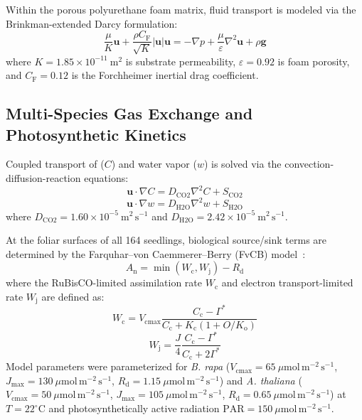 \documentclass[pdflatex,sn-nature,iicol]{sn-jnl}
\begin{document}
Within the porous polyurethane foam matrix, fluid transport is modeled via the Brinkman-extended Darcy formulation:
\begin{equation}
\frac{\mu}{K} \mathbf{u} + \frac{\rho C_{\mathrm{F}}}{\sqrt{K}} |\mathbf{u}| \mathbf{u} = -\nabla p + \frac{\mu}{\varepsilon} \nabla^2 \mathbf{u} + \rho \mathbf{g}
\label{eq:brinkman}
\end{equation}
where $K = 1.85 \times 10^{-11}\ \mathrm{m^2}$ is substrate permeability, $\varepsilon = 0.92$ is foam porosity, and $C_{\mathrm{F}} = 0.12$ is the Forchheimer inertial drag coefficient.

\subsection{Multi-Species Gas Exchange and Photosynthetic Kinetics}\label{sec:fvcb_meth}

Coupled transport of  ($C$) and water vapor ($w$) is solved via the convection-diffusion-reaction equations:
\begin{equation}
\mathbf{u} \cdot \nabla C = D_{\mathrm{CO2}} \nabla^2 C + S_{\mathrm{CO2}}
\label{eq:scalar_co2}
\end{equation}
\begin{equation}
\mathbf{u} \cdot \nabla w = D_{\mathrm{H2O}} \nabla^2 w + S_{\mathrm{H2O}}
\label{eq:scalar_h2o}
\end{equation}
where $D_{\mathrm{CO2}} = 1.60 \times 10^{-5}\ \mathrm{m^2\,s^{-1}}$ and $D_{\mathrm{H2O}} = 2.42 \times 10^{-5}\ \mathrm{m^2\,s^{-1}}$.

At the foliar surfaces of all 164 seedlings, biological source/sink terms are determined by the Farquhar--von Caemmerer--Berry (FvCB) model~\cite{farquhar1980biochemical}:
\begin{equation}
A_{\mathrm{n}} = \min(W_{\mathrm{c}}, W_{\mathrm{j}}) - R_{\mathrm{d}}
\label{eq:fvcb}
\end{equation}
where the RuBisCO-limited assimilation rate $W_{\mathrm{c}}$ and electron transport-limited rate $W_{\mathrm{j}}$ are defined as:
\begin{equation}
W_{\mathrm{c}} = V_{\mathrm{cmax}} \frac{C_{\mathrm{c}} - \Gamma^*}{C_{\mathrm{c}} + K_{\mathrm{c}} (1 + O / K_{\mathrm{o}})}
\label{eq:wc}
\end{equation}
\begin{equation}
W_{\mathrm{j}} = \frac{J}{4} \frac{C_{\mathrm{c}} - \Gamma^*}{C_{\mathrm{c}} + 2 \Gamma^*}
\label{eq:wj}
\end{equation}
Model parameters were parameterized for \textit{B. rapa} ($V_{\mathrm{cmax}} = 65\ \mu\mathrm{mol\,m^{-2}\,s^{-1}}$, $J_{\mathrm{max}} = 130\ \mu\mathrm{mol\,m^{-2}\,s^{-1}}$, $R_{\mathrm{d}} = 1.15\ \mu\mathrm{mol\,m^{-2}\,s^{-1}}$) and \textit{A. thaliana} ($V_{\mathrm{cmax}} = 50\ \mu\mathrm{mol\,m^{-2}\,s^{-1}}$, $J_{\mathrm{max}} = 105\ \mu\mathrm{mol\,m^{-2}\,s^{-1}}$, $R_{\mathrm{d}} = 0.65\ \mu\mathrm{mol\,m^{-2}\,s^{-1}}$) at $T = 22^\circ\mathrm{C}$ and photosynthetically active radiation $\mathrm{PAR} = 150\ \mu\mathrm{mol\,m^{-2}\,s^{-1}}$.
\end{document}
